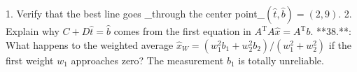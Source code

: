 1. Verify that the best line goes _through the center point_\((\widehat{t},\widehat{b})=(2,9)\).
2. Explain why \(C+D\widehat{t}=\widehat{b}\) comes from the first equation in \(A^{\mathrm{T}}A\widehat{x}=A^{\mathrm{T}}b\).
**38.**: What happens to the weighted average \(\widehat{x}_{W}=(w_{1}^{2}b_{1}+w_{2}^{2}b_{2})/(w_{1}^{2}+w_{2}^{2})\) if the first weight \(w_{1}\) approaches zero? The measurement \(b_{1}\) is totally unreliable.

